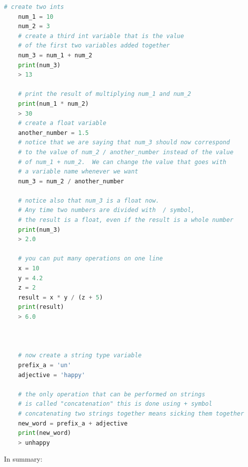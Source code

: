 \documentclass[]{article}
\begin{document}
\begin{lstlisting}[language=Python]
    # create two ints
    num_1 = 10
    num_2 = 3
    # create a third int variable that is the value 
    # of the first two variables added together
    num_3 = num_1 + num_2
    print(num_3)
    > 13
    
    # print the result of multiplying num_1 and num_2
    print(num_1 * num_2)
    > 30
    # create a float variable
    another_number = 1.5
    # notice that we are saying that num_3 should now correspond
    # to the value of num_2 / another_number instead of the value
    # of num_1 + num_2.  We can change the value that goes with 
    # a variable name whenever we want
    num_3 = num_2 / another_number
    
    # notice also that num_3 is a float now.  
    # Any time two numbers are divided with  / symbol, 
    # the result is a float, even if the result is a whole number
    print(num_3)
    > 2.0
    
    # you can put many operations on one line
    x = 10
    y = 4.2
    z = 2
    result = x * y / (z + 5)
    print(result)
    > 6.0
    
    
    
    # now create a string type variable
    prefix_a = 'un'
    adjective = 'happy'
    
    # the only operation that can be performed on strings 
    # is called "concatenation" this is done using + symbol
    # concatenating two strings together means sicking them together
    new_word = prefix_a + adjective
    print(new_word)
    > unhappy
\end{lstlisting}

In summary:
\end{document}
